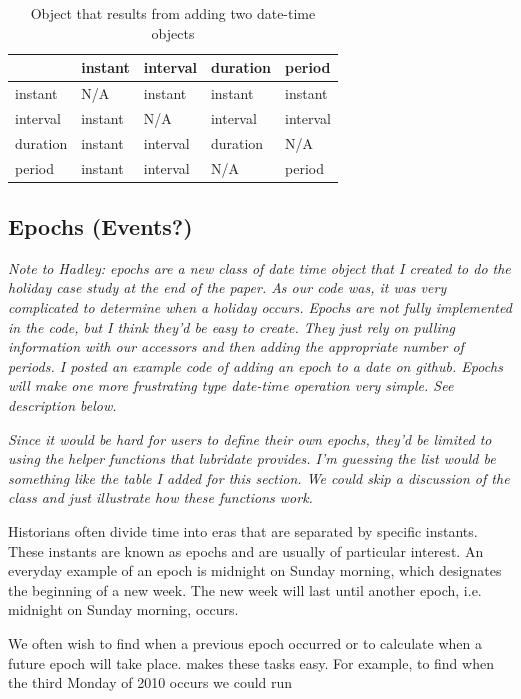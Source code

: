 \documentclass[article]{jss}
\begin{document}
\begin{table}
  \begin{center}
  \begin{tabular}{l|llll}
  & instant & interval & duration & period\\
  \hline
  instant & N/A & instant & instant & instant\\
  interval & instant & N/A & interval & interval\\
  duration & instant & interval & duration & N/A\\
  period & instant & interval & N/A & period\\
  \hline
    
  \end{tabular}
  \end{center}
  \caption{Object that results from adding two date-time objects}
  \label{tbl:date-math}
\end{table}

\subsection{Epochs (Events?)}
\emph{Note to Hadley: epochs are a new class of date time object that I created to do the holiday case study at the end of the paper.  As our code was, it was very complicated to determine when a holiday occurs. Epochs are not fully implemented in the code, but I think they'd be easy to create. They just rely on pulling information with our accessors and then adding the appropriate number of periods. I posted an example code of adding an epoch to a date on github. Epochs will make one more frustrating type date-time operation very simple. See description below.}

\emph{Since it would be hard for users to define their own epochs, they'd be limited to using the helper functions that lubridate provides. I'm guessing the list would be something like the table I added for this section. We could skip a discussion of the class and just illustrate how these functions work.}

Historians often divide time into eras that are separated by specific instants. These instants are known as epochs and are usually of particular interest. An everyday example of an epoch is midnight on Sunday morning, which designates the beginning of a new week. The new week will last until another epoch, i.e. midnight on Sunday morning, occurs. 

We often wish to find when a previous epoch occurred or to calculate when a future epoch will take place.  makes these tasks easy. For example, to find when the third Monday of 2010 occurs we could run\\
\end{document}

